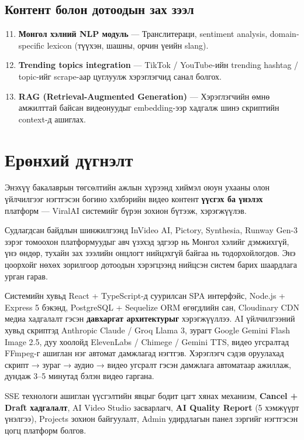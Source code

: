 \subsection{Контент болон дотоодын зах зээл}
\begin{enumerate}
  \setcounter{enumi}{10}
  \item \textbf{Монгол хэлний NLP модуль} --- Транслитераци, sentiment analysis, domain-specific lexicon (түүхэн, шашны, орчин үеийн slang).

  \item \textbf{Trending topics integration} --- TikTok / YouTube-ийн trending hashtag / topic-ийг scrape-аар цуглуулж хэрэглэгчид санал болгох.

  \item \textbf{RAG (Retrieval-Augmented Generation)} --- Хэрэглэгчийн өмнө амжилттай байсан видеонуудыг embedding-ээр хадгалж шинэ скриптийн context-д ашиглах.
\end{enumerate}


\section{Ерөнхий дүгнэлт}

Энэхүү бакалаврын төгсөлтийн ажлын хүрээнд хиймэл оюун ухааны олон үйлчилгээг нэгтгэсэн богино хэлбэрийн видео контент \textbf{үүсгэх ба үнэлэх} платформ --- ViralAI системийг бүрэн зохион бүтээж, хэрэгжүүлэв.

Судлагдсан байдлын шинжилгээнд InVideo AI, Pictory, Synthesia, Runway Gen-3 зэрэг томоохон платформуудыг авч үзэхэд эдгээр нь Монгол хэлийг дэмжихгүй, үнэ өндөр, тухайн зах зээлийн онцлогт нийцэхгүй байгаа нь тодорхойлогдов. Энэ цоорхойг нөхөх зорилгоор дотоодын хэрэгцээнд нийцсэн систем барих шаардлага урган гарав.

Системийн хувьд React + TypeScript-д суурилсан SPA интерфэйс, Node.js + Express 5 бэкэнд, PostgreSQL + Sequelize ORM өгөгдлийн сан, Cloudinary CDN медиа хадгалалт гэсэн \textbf{давхаргат архитектурыг} хэрэгжүүллээ. AI үйлчилгээний хувьд скриптэд Anthropic Claude / Groq Llama 3, зурагт Google Gemini Flash Image 2.5, дуу хоолойд ElevenLabs / Chimege / Gemini TTS, видео угсралтад FFmpeg-г ашиглан нэг автомат дамжлагад нэгтгэв. Хэрэглэгч сэдэв оруулахад скрипт → зураг → аудио → видео угсралт гэсэн дамжлага автоматаар ажиллаж, дундаж 3--5 минутад бэлэн видео гаргана.

SSE технологи ашиглан үүсгэлтийн явцыг бодит цагт хянах механизм, \textbf{Cancel + Draft хадгалалт}, AI Video Studio засварлагч, \textbf{AI Quality Report} (5 хэмжүүрт үнэлгээ), Projects зохион байгуулалт, Admin удирдлагын панел зэргийг нэгтгэсэн цогц платформ болгов.

